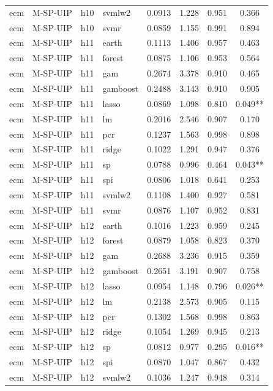 \begin{ThreePartTable}
\begin{longtable}[t]{llclcccc}
ecm & M-SP-UIP & h10 & svmlw2 & 0.0913 & 1.228 & 0.951 & 0.366\\
ecm & M-SP-UIP & h10 & svmr & 0.0859 & 1.155 & 0.991 & 0.894\\
\addlinespace
ecm & M-SP-UIP & h11 & earth & 0.1113 & 1.406 & 0.957 & 0.463\\
ecm & M-SP-UIP & h11 & forest & 0.0875 & 1.106 & 0.953 & 0.564\\
ecm & M-SP-UIP & h11 & gam & 0.2674 & 3.378 & 0.910 & 0.465\\
ecm & M-SP-UIP & h11 & gamboost & 0.2488 & 3.143 & 0.910 & 0.905\\
ecm & M-SP-UIP & h11 & lasso & 0.0869 & 1.098 & 0.810 & 0.049**\\
ecm & M-SP-UIP & h11 & lm & 0.2016 & 2.546 & 0.907 & 0.170\\
ecm & M-SP-UIP & h11 & pcr & 0.1237 & 1.563 & 0.998 & 0.898\\
ecm & M-SP-UIP & h11 & ridge & 0.1022 & 1.291 & 0.947 & 0.376\\
ecm & M-SP-UIP & h11 & sp & 0.0788 & 0.996 & 0.464 & 0.043**\\
ecm & M-SP-UIP & h11 & spi & 0.0806 & 1.018 & 0.641 & 0.253\\
ecm & M-SP-UIP & h11 & svmlw2 & 0.1108 & 1.400 & 0.927 & 0.581\\
ecm & M-SP-UIP & h11 & svmr & 0.0876 & 1.107 & 0.952 & 0.831\\
\addlinespace
ecm & M-SP-UIP & h12 & earth & 0.1016 & 1.223 & 0.959 & 0.245\\
ecm & M-SP-UIP & h12 & forest & 0.0879 & 1.058 & 0.823 & 0.370\\
ecm & M-SP-UIP & h12 & gam & 0.2688 & 3.236 & 0.915 & 0.359\\
ecm & M-SP-UIP & h12 & gamboost & 0.2651 & 3.191 & 0.907 & 0.758\\
ecm & M-SP-UIP & h12 & lasso & 0.0954 & 1.148 & 0.796 & 0.026**\\
ecm & M-SP-UIP & h12 & lm & 0.2138 & 2.573 & 0.905 & 0.115\\
ecm & M-SP-UIP & h12 & pcr & 0.1302 & 1.568 & 0.998 & 0.863\\
ecm & M-SP-UIP & h12 & ridge & 0.1054 & 1.269 & 0.945 & 0.213\\
ecm & M-SP-UIP & h12 & sp & 0.0812 & 0.977 & 0.295 & 0.016**\\
ecm & M-SP-UIP & h12 & spi & 0.0870 & 1.047 & 0.867 & 0.432\\
ecm & M-SP-UIP & h12 & svmlw2 & 0.1036 & 1.247 & 0.948 & 0.314\\

\end{longtable}
\end{ThreePartTable}
